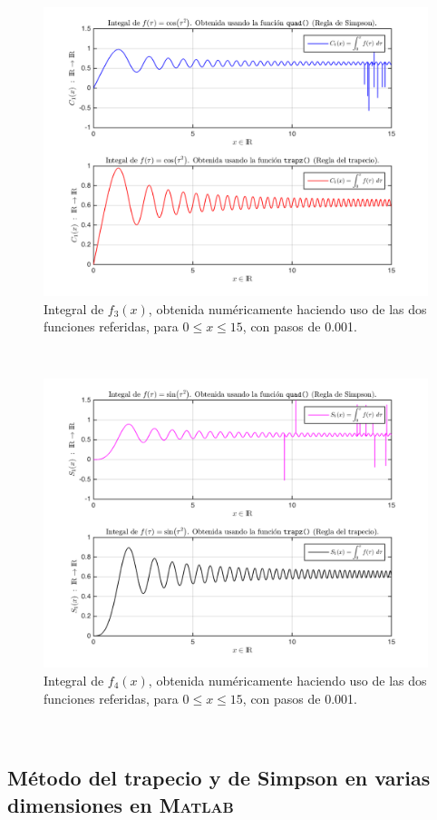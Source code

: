 \documentclass[11pt, spanish]{article}
\begin{document}
\begin{figure}[H]
\centering
	\includegraphics[scale=0.6]{data/img/f3intplot0001}
	\caption{Integral de $f_3(x)$, obtenida numéricamente haciendo uso de las dos funciones referidas, para $0 \leq x \leq 15$, con pasos de 0.001.}
\end{figure}\

\begin{figure}[H]
\centering
	\includegraphics[scale=0.6]{data/img/f4intplot0001}
	\caption{Integral de $f_4(x)$, obtenida numéricamente haciendo uso de las dos funciones referidas, para $0 \leq x \leq 15$, con pasos de 0.001.}
\end{figure}\

\subsection{Método del trapecio y de Simpson en varias dimensiones en \textsc{Matlab}}
\end{document}
